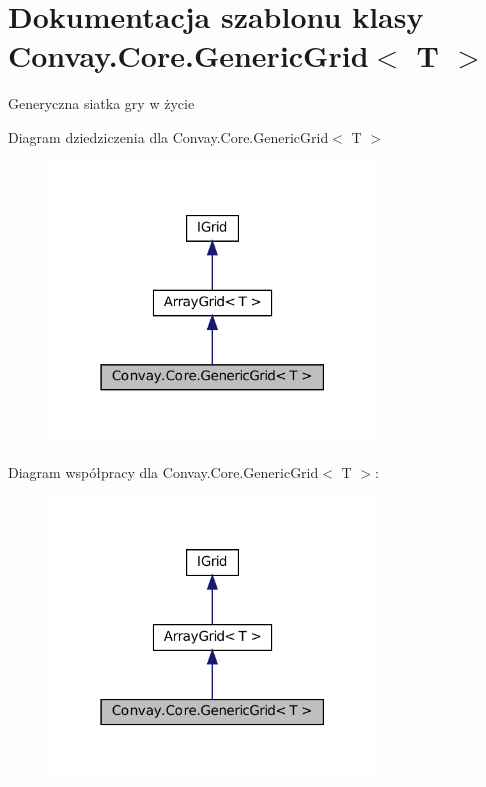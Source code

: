 \hypertarget{class_convay_1_1_core_1_1_generic_grid}{}\section{Dokumentacja szablonu klasy Convay.\+Core.\+Generic\+Grid$<$ T $>$}
\label{class_convay_1_1_core_1_1_generic_grid}


Generyczna siatka gry w życie  




Diagram dziedziczenia dla Convay.\+Core.\+Generic\+Grid$<$ T $>$
\nopagebreak
\begin{figure}[H]
\begin{center}
\leavevmode
\includegraphics[width=247pt]{class_convay_1_1_core_1_1_generic_grid__inherit__graph}
\end{center}
\end{figure}


Diagram współpracy dla Convay.\+Core.\+Generic\+Grid$<$ T $>$\+:
\nopagebreak
\begin{figure}[H]
\begin{center}
\leavevmode
\includegraphics[width=247pt]{class_convay_1_1_core_1_1_generic_grid__coll__graph}
\end{center}
\end{figure}
